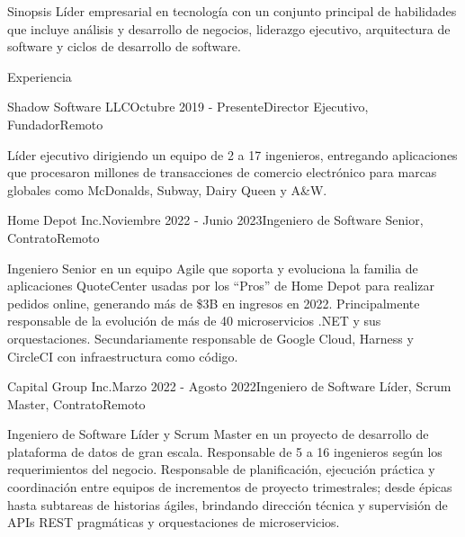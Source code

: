 \documentclass{resume} %
\begin{document}
	
	\begin{rSection}{Sinopsis}
		Líder empresarial en tecnología con un conjunto principal de habilidades que incluye análisis y desarrollo de negocios, liderazgo ejecutivo, arquitectura de software y ciclos de desarrollo de software.
	\end{rSection}
	
	
	\begin{rSection}{Experiencia}
		
		\begin{rSubsection}{Shadow Software LLC}{Octubre 2019 - Presente}{Director Ejecutivo, Fundador}{Remoto}
			\item[] Líder ejecutivo dirigiendo un equipo de 2 a 17 ingenieros, entregando aplicaciones que procesaron millones de transacciones de comercio electrónico para marcas globales como McDonalds, Subway, Dairy Queen y A\&W.
		\end{rSubsection}
		
		\begin{rSubsection}{Home Depot Inc.}{Noviembre 2022 - Junio 2023}{Ingeniero de Software Senior, Contrato}{Remoto}
			\item[] Ingeniero Senior en un equipo Agile que soporta y evoluciona la familia de aplicaciones QuoteCenter usadas por los “Pros” de Home Depot para realizar pedidos online, generando más de \$3B en ingresos en 2022. Principalmente responsable de la evolución de más de 40 microservicios .NET y sus orquestaciones. Secundariamente responsable de Google Cloud, Harness y CircleCI con infraestructura como código.
		\end{rSubsection}
		
		\begin{rSubsection}{Capital Group Inc.}{Marzo 2022 - Agosto 2022}{Ingeniero de Software Líder, Scrum Master, Contrato}{Remoto}
			\item[] Ingeniero de Software Líder y Scrum Master en un proyecto de desarrollo de plataforma de datos de gran escala. Responsable de 5 a 16 ingenieros según los requerimientos del negocio. Responsable de planificación, ejecución práctica y coordinación entre equipos de incrementos de proyecto trimestrales; desde épicas hasta subtareas de historias ágiles, brindando dirección técnica y supervisión de APIs REST pragmáticas y orquestaciones de microservicios.
		\end{rSubsection}
		

\end{rSection}
\end{document}
